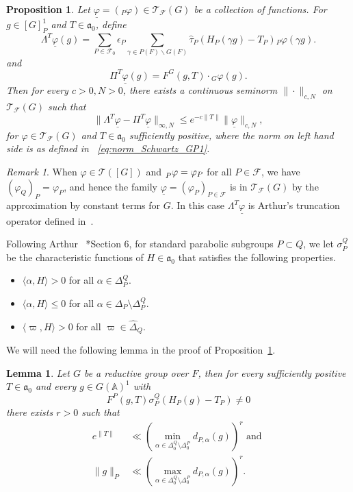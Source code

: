 \documentclass[letterpaper,11pt]{amsart}
\newcommand{\fa}{\mathfrak{a}}
\newcommand{\bA}{\mathbb{A}}
\newcommand{\cF}{\mathcal{F}}
\newcommand{\cT}{\mathcal{T}}
\newcommand{\<}{\negthickspace}
\theoremstyle{definition}
\theoremstyle{plain}
\newtheorem{prop}[definition]{Proposition}
\newtheorem{lemma}[definition]{Lemma}
\theoremstyle{remark}
\newtheorem{remark}[definition]{Remark}
\numberwithin{equation}{section}
\begin{document}
\begin{prop} \label{prop:relative_truncation}
Let
$\underline{\varphi}=({}_P \varphi) \in \cT_{\cF}(G)$ be a collection of functions. For $g \in [G]_P^1$ and $T \in \fa_0$, define
    \[
    \Lambda^T \underline{\varphi}(g) =
    \sum_{P \in \cF_0} \epsilon_P
    \sum_{\gamma \in P(F) \backslash G(F)}
    \widehat{\tau}_{P}(H_{P}(\gamma g)-T_{P}) {}_P \varphi(\gamma g).
    \]
and
    \[
    \Pi^T \underline{\varphi}(g) = F^{G}(g,T) \cdot {}_{G} \varphi(g).
    \]
Then for every $c>0,N>0$, there exists a continuous seminorm $\| \cdot
\|_{c,N}$ on $\cT_{\cF}(G)$ such that
    \[
    \| \Lambda^{T} \underline{\varphi} - \Pi^T \underline{\varphi}
    \|_{\infty,N} \le e^{-c\|T\|} \| \underline{\varphi} \|_{c,N},
    \]
for $\varphi \in \cT_{\cF}(G)$ and $T \in \fa_0$ sufficiently positive, where the norm on left hand side is as defined in ~\eqref{eq:norm_Schwartz_GP1}.
\end{prop}

\begin{remark}
When $\varphi \in \cT([G])$ and $\prescript{}{P}{\varphi} = \varphi_P$ for
all $P \in \cF$, we have $(\varphi_Q)_P = \varphi_P$, and hence the family
$\underline{\varphi} = (\varphi_P)_{P \in \cF}$ is in $\cT_{\cF}(G)$ by the approximation by constant terms for $G$.
In this case $\Lambda^T \underline{\varphi}$ is Arthur's truncation operator
defined in~\cite{Arthur2}.
\end{remark}

Following Arthur ~\cite{Arthur3}*{Section 6}, for standard parabolic subgroups $P \subset Q$, we let $\sigma_P^Q$ be the characteristic functions of $H \in \fa_0$ that satisfies the following properties.
\begin{itemize}
    \item $\langle \alpha,H \rangle > 0$ for all $\alpha \in \Delta_P^Q$.
    \item $\langle \alpha,H \rangle \le 0$ for all $\alpha \in \Delta_P \setminus \Delta_P^Q$.
    \item $\langle \varpi, H \rangle > 0$ for all $\varpi \in \widehat{\Delta}_Q$.
\end{itemize}

We will need the following lemma in the proof of
Proposition~\ref{prop:relative_truncation}.

\begin{lemma} \label{lem:F_sigma_non_zero}
Let $G$ be a reductive group over $F$, then for every sufficiently positive
$T \in \fa_0$ and every $g \in G(\bA)^1$ with
    \[
    F^P(g,T) \sigma_P^Q(H_P(g)-T_P) \ne 0
    \]
there exists $r>0$ such that
    \begin{align*}
    e^{\| T \|} &\ll \left( \min_{\alpha \in \Delta_0^Q \setminus \Delta_0^P}
    d_{P,\alpha}(g) \right)^r \text{ and } \\
    \| g \|_P &\ll \left( \max_{\alpha \in \Delta_0^Q \setminus \Delta_0^P}
    d_{P,\alpha}(g)  \right)^r.
    \end{align*}
\end{lemma}
\end{document}
